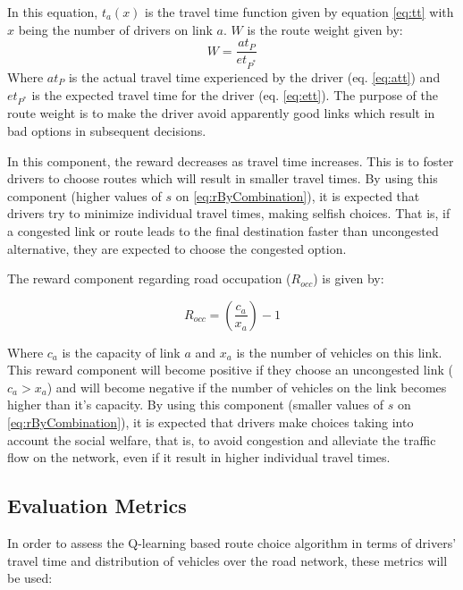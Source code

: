 \documentclass[12pt]{article}
\begin{document}
In this equation, $t_a(x)$ is the travel time function given by equation \eqref{eq:tt} with $x$ being the number of drivers on link $a$. $W$ is the route weight given by: $$W = \frac{at_P}{et_{P^*}}$$
Where $at_P$ is the actual travel time experienced by the driver (eq. \eqref{eq:att}) and $et_{P^*}$ is the expected travel time for the driver (eq. \eqref{eq:ett}). The purpose of the route weight is to make the driver avoid apparently good links which result in bad options in subsequent decisions.

In this component, the reward decreases as travel time increases. This is to foster drivers to choose routes which will result in smaller travel times. By using this component (higher values of $s$ on \eqref{eq:rByCombination}), it is expected that drivers try to minimize individual travel times, making selfish choices. That is, if a congested link or route leads to the final destination faster than uncongested alternative, they are expected to choose the congested option. 

The reward component regarding road occupation ($R_{occ}$) is given by:

\begin{equation}
\label{eq:rByRoadOcc}
R_{occ} = \left(\frac{c_a}{x_a}\right) - 1
\end{equation}

Where $c_a$ is the capacity of link $a$ and $x_a$ is the number of vehicles on this link. This reward component will become positive if they choose an uncongested link ($c_a > x_a$) and will become negative if the number of vehicles on the link becomes higher than it's capacity. By using this component (smaller values of $s$ on \eqref{eq:rByCombination}), it is expected that drivers make choices taking into account the social welfare, that is, to avoid congestion and alleviate the traffic flow on the network, even if it result in higher individual travel times.

\subsection{Evaluation Metrics}
In order to assess the Q-learning based route choice algorithm in terms of drivers' travel time and distribution of vehicles over the road network, these metrics will be used:
\end{document}
